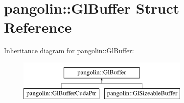 \hypertarget{structpangolin_1_1_gl_buffer}{}\section{pangolin\+:\+:Gl\+Buffer Struct Reference}
\label{structpangolin_1_1_gl_buffer}
Inheritance diagram for pangolin\+:\+:Gl\+Buffer\+:\begin{figure}[H]
\begin{center}
\leavevmode
\includegraphics[height=2.000000cm]{structpangolin_1_1_gl_buffer}
\end{center}
\end{figure}
